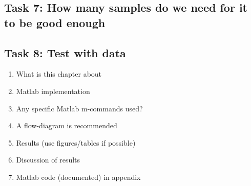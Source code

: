 \subsection{Task 7: How many samples do we need for it to be good enough}

\subsection{Task 8: Test with data}

\begin{enumerate}[i]
    \item What is this chapter about
    \item Matlab implementation
    \item Any specific Matlab m-commands used?
    \item A flow-diagram is recommended
    \item Results (use figures/tables if possible)
    \item Discussion of results
    \item Matlab code (documented) in appendix
\end{enumerate}





